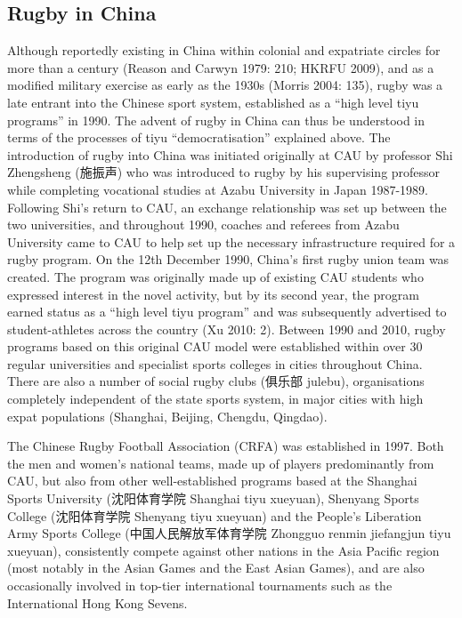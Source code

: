 \subsection{Rugby in China}
Although reportedly existing in China within colonial and expatriate circles for more than a century (Reason and Carwyn 1979: 210; HKRFU 2009), and as a modified military exercise as early as the 1930s (Morris 2004: 135), rugby was a late entrant into the Chinese sport system, established as a ``high level tiyu programs'' in 1990.  The advent of rugby in China can thus be understood in terms of the processes of tiyu “democratisation” explained above.  The introduction of rugby into China was initiated originally at CAU by professor Shi Zhengsheng (施振声) who was introduced to rugby by his supervising professor while completing vocational studies at Azabu University in Japan 1987-1989.  Following Shi’s return to CAU, an exchange relationship was set up between the two universities, and throughout 1990, coaches and referees from Azabu University came to CAU to help set up the necessary infrastructure required for a rugby program.  On the 12th December 1990, China’s first rugby union team was created.  The program was originally made up of existing CAU students who expressed interest in the novel activity, but by its second year, the program earned status as a “high level tiyu program” and was subsequently advertised to student-athletes across the country (Xu 2010: 2).  Between 1990 and 2010, rugby programs based on this original CAU model were established within over 30 regular universities and specialist sports colleges in cities throughout China.  There are also a number of social rugby clubs (俱乐部 julebu), organisations completely independent of the state sports system, in major cities with high expat populations (Shanghai, Beijing, Chengdu, Qingdao).


The Chinese Rugby Football Association (CRFA) was established in 1997. Both the men and women’s national teams, made up of players predominantly from CAU, but also from other well-established programs based at the Shanghai Sports University (沈阳体育学院 Shanghai tiyu xueyuan), Shenyang Sports College (沈阳体育学院 Shenyang tiyu xueyuan) and the People’s Liberation Army Sports College (中国人民解放军体育学院 Zhongguo renmin jiefangjun tiyu xueyuan), consistently compete against other nations in the Asia Pacific region (most notably in the Asian Games and the East Asian Games), and are also occasionally involved in top-tier international tournaments such as the International Hong Kong Sevens.


